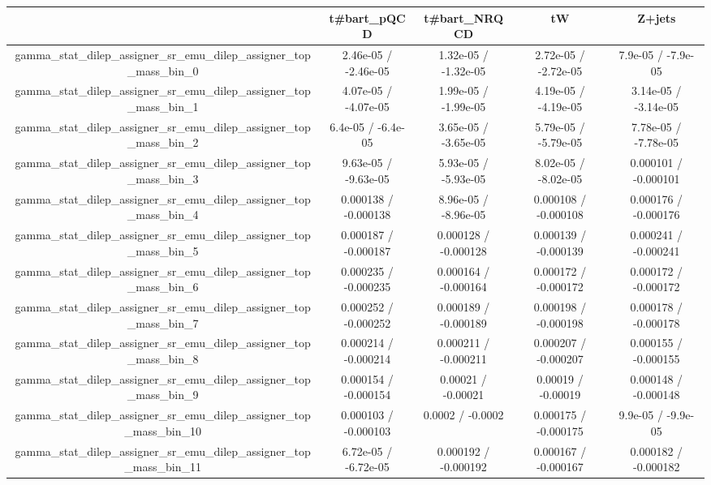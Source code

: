 \documentclass[10pt]{article}
\begin{document}
\begin{table}[htbp]
\begin{center}
\begin{tabular}{|c|c|c|c|c|}
\hline 
      & t#bar{t}_{pQCD}      & t#bar{t}_{NRQCD}      & tW      & Z+jets \\ 
\hline 
  gamma_stat_dilep_assigner_sr_emu_dilep_assigner_top_mass_bin_0 & 2.46e-05 / -2.46e-05 & 1.32e-05 / -1.32e-05 & 2.72e-05 / -2.72e-05 & 7.9e-05 / -7.9e-05 \\ 
  gamma_stat_dilep_assigner_sr_emu_dilep_assigner_top_mass_bin_1 & 4.07e-05 / -4.07e-05 & 1.99e-05 / -1.99e-05 & 4.19e-05 / -4.19e-05 & 3.14e-05 / -3.14e-05 \\ 
  gamma_stat_dilep_assigner_sr_emu_dilep_assigner_top_mass_bin_2 & 6.4e-05 / -6.4e-05 & 3.65e-05 / -3.65e-05 & 5.79e-05 / -5.79e-05 & 7.78e-05 / -7.78e-05 \\ 
  gamma_stat_dilep_assigner_sr_emu_dilep_assigner_top_mass_bin_3 & 9.63e-05 / -9.63e-05 & 5.93e-05 / -5.93e-05 & 8.02e-05 / -8.02e-05 & 0.000101 / -0.000101 \\ 
  gamma_stat_dilep_assigner_sr_emu_dilep_assigner_top_mass_bin_4 & 0.000138 / -0.000138 & 8.96e-05 / -8.96e-05 & 0.000108 / -0.000108 & 0.000176 / -0.000176 \\ 
  gamma_stat_dilep_assigner_sr_emu_dilep_assigner_top_mass_bin_5 & 0.000187 / -0.000187 & 0.000128 / -0.000128 & 0.000139 / -0.000139 & 0.000241 / -0.000241 \\ 
  gamma_stat_dilep_assigner_sr_emu_dilep_assigner_top_mass_bin_6 & 0.000235 / -0.000235 & 0.000164 / -0.000164 & 0.000172 / -0.000172 & 0.000172 / -0.000172 \\ 
  gamma_stat_dilep_assigner_sr_emu_dilep_assigner_top_mass_bin_7 & 0.000252 / -0.000252 & 0.000189 / -0.000189 & 0.000198 / -0.000198 & 0.000178 / -0.000178 \\ 
  gamma_stat_dilep_assigner_sr_emu_dilep_assigner_top_mass_bin_8 & 0.000214 / -0.000214 & 0.000211 / -0.000211 & 0.000207 / -0.000207 & 0.000155 / -0.000155 \\ 
  gamma_stat_dilep_assigner_sr_emu_dilep_assigner_top_mass_bin_9 & 0.000154 / -0.000154 & 0.00021 / -0.00021 & 0.00019 / -0.00019 & 0.000148 / -0.000148 \\ 
  gamma_stat_dilep_assigner_sr_emu_dilep_assigner_top_mass_bin_10 & 0.000103 / -0.000103 & 0.0002 / -0.0002 & 0.000175 / -0.000175 & 9.9e-05 / -9.9e-05 \\ 
  gamma_stat_dilep_assigner_sr_emu_dilep_assigner_top_mass_bin_11 & 6.72e-05 / -6.72e-05 & 0.000192 / -0.000192 & 0.000167 / -0.000167 & 0.000182 / -0.000182 \\ 

\end{tabular}
\end{center}
\end{table}
\end{document}
